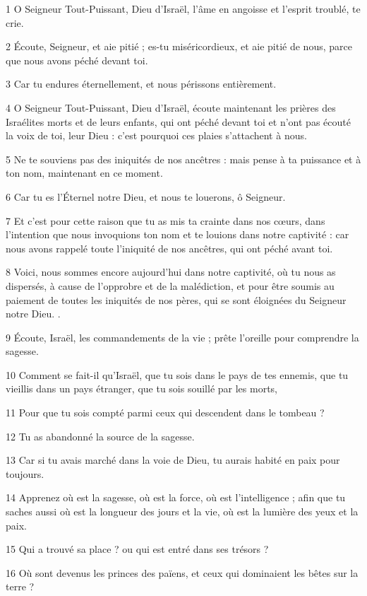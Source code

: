 \par 1 O Seigneur Tout-Puissant, Dieu d'Israël, l'âme en angoisse et l'esprit troublé, te crie.
\par 2 Écoute, Seigneur, et aie pitié ; es-tu miséricordieux, et aie pitié de nous, parce que nous avons péché devant toi.
\par 3 Car tu endures éternellement, et nous périssons entièrement.
\par 4 O Seigneur Tout-Puissant, Dieu d'Israël, écoute maintenant les prières des Israélites morts et de leurs enfants, qui ont péché devant toi et n'ont pas écouté la voix de toi, leur Dieu : c'est pourquoi ces plaies s'attachent à nous.
\par 5 Ne te souviens pas des iniquités de nos ancêtres : mais pense à ta puissance et à ton nom, maintenant en ce moment.
\par 6 Car tu es l'Éternel notre Dieu, et nous te louerons, ô Seigneur.
\par 7 Et c'est pour cette raison que tu as mis ta crainte dans nos cœurs, dans l'intention que nous invoquions ton nom et te louions dans notre captivité : car nous avons rappelé toute l'iniquité de nos ancêtres, qui ont péché avant toi.
\par 8 Voici, nous sommes encore aujourd'hui dans notre captivité, où tu nous as dispersés, à cause de l'opprobre et de la malédiction, et pour être soumis au paiement de toutes les iniquités de nos pères, qui se sont éloignées du Seigneur notre Dieu. .
\par 9 Écoute, Israël, les commandements de la vie ; prête l'oreille pour comprendre la sagesse.
\par 10 Comment se fait-il qu'Israël, que tu sois dans le pays de tes ennemis, que tu vieillis dans un pays étranger, que tu sois souillé par les morts,
\par 11 Pour que tu sois compté parmi ceux qui descendent dans le tombeau ?
\par 12 Tu as abandonné la source de la sagesse.
\par 13 Car si tu avais marché dans la voie de Dieu, tu aurais habité en paix pour toujours.
\par 14 Apprenez où est la sagesse, où est la force, où est l'intelligence ; afin que tu saches aussi où est la longueur des jours et la vie, où est la lumière des yeux et la paix.
\par 15 Qui a trouvé sa place ? ou qui est entré dans ses trésors ?
\par 16 Où sont devenus les princes des païens, et ceux qui dominaient les bêtes sur la terre ?
